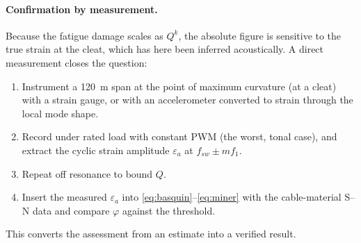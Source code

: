\paragraph{Confirmation by measurement.}
Because the fatigue damage scales as $Q^{k}$, the absolute figure is sensitive to
the true strain at the cleat, which has here been inferred acoustically. A direct
measurement closes the question:
\begin{enumerate}[leftmargin=*]
	\item Instrument a \SI{120}{\meter} span at the point of maximum curvature (at a
	cleat) with a strain gauge, or with an accelerometer converted to strain through
	the local mode shape.
	\item Record under rated load with constant PWM (the worst, tonal case), and
	extract the cyclic strain amplitude $\varepsilon_a$ at $f_{sw}\pm m f_1$.
	\item Repeat off resonance to bound $Q$.
	\item Insert the measured $\varepsilon_a$ into \eqref{eq:basquin}--\eqref{eq:miner}
	with the cable-material S--N data and compare $\varphi$ against the threshold.
\end{enumerate}
This converts the assessment from an estimate into a verified result.

